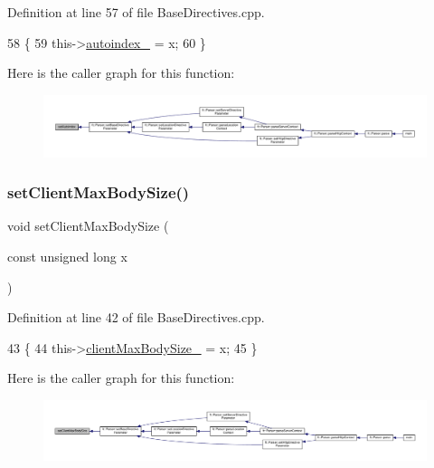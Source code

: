 Definition at line 57 of file Base\+Directives.\+cpp.


\begin{DoxyCode}
58     \{
59         this->\hyperlink{classft_1_1_base_directives_a4ebffbe32f50a462afa139c6f03c1a4f}{autoindex\_} = x;
60     \}
\end{DoxyCode}
Here is the caller graph for this function\+:
\nopagebreak
\begin{figure}[H]
\begin{center}
\leavevmode
\includegraphics[width=350pt]{classft_1_1_base_directives_ae7293c7bbf34e9bdc60c540dccd53342_icgraph}
\end{center}
\end{figure}
\mbox{\label{classft_1_1_base_directives_a39bf4922f3236043c76beaffaa557a3b}} 
\subsubsection{\texorpdfstring{set\+Client\+Max\+Body\+Size()}{setClientMaxBodySize()}}
{\footnotesize\ttfamily void set\+Client\+Max\+Body\+Size (\begin{DoxyParamCaption}\item[{const unsigned long}]{x }\end{DoxyParamCaption})\hspace{0.3cm}{\ttfamily [inherited]}}



Definition at line 42 of file Base\+Directives.\+cpp.


\begin{DoxyCode}
43     \{
44         this->\hyperlink{classft_1_1_base_directives_ad65c2594d2a90ca065d410dfd4066a19}{clientMaxBodySize\_} = x;
45     \}
\end{DoxyCode}
Here is the caller graph for this function\+:
\nopagebreak
\begin{figure}[H]
\begin{center}
\leavevmode
\includegraphics[width=350pt]{classft_1_1_base_directives_a39bf4922f3236043c76beaffaa557a3b_icgraph}
\end{center}
\end{figure}
\mbox{\label{classft_1_1_base_directives_a505ecc88b3e1779583ad60cc243c7769}} 
